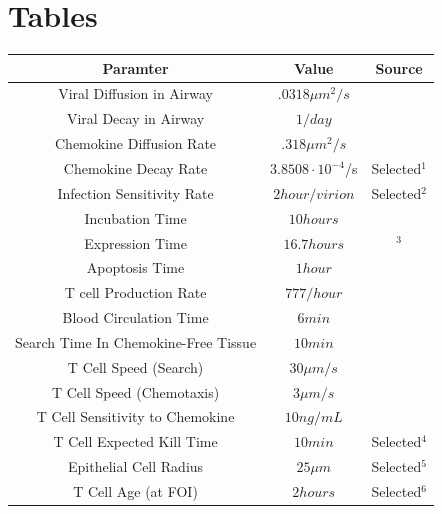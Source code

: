 \documentclass[10pt]{article}
\begin{document}
\section*{Tables}


\begin{table}
\begin{center}
\begin{tabular}{ | c | c | c | }
  \hline                        
  Paramter & Value & Source \\
  \hline
  Viral Diffusion in Airway & $.0318 \mu m^2/s$ & \cite{Beauchemin2006} \\
  Viral Decay in Airway &  $1/day$ & \cite{Lee2009} \\
  Chemokine Diffusion Rate & $.318 \mu m^2/s$ & \cite{Beauchemin2006} \\
  Chemokine Decay Rate &  $3.8508\cdot10^{-4}$/s & Selected$^1$\\
  Infection Sensitivity Rate &  $2 hour/virion$ &  Selected$^2$ \\
  Incubation Time &  $10 hours$ & \cite{Mitchell2011} \\
  Expression Time &  $16.7 hours$ & \cite{Mitchell2011}$^3$ \\
  Apoptosis Time & $1 hour$ & \cite{Ganusov2008} \\
  T cell Production Rate & $777/hour$ & \cite{Miao2010} \\ 
  Blood Circulation Time & $6 min$ & \cite{Banerjee2010b} \\
  Search Time In Chemokine-Free Tissue & $10 min$ & \cite{Banerjee2010b} \\
  T Cell Speed (Search) & $30 \mu m/s$ & \cite{Miller2003} \\
  T Cell Speed (Chemotaxis) & $3 \mu m/s$ & \cite{Miller2003} \\
  T Cell Sensitivity to Chemokine & $10 ng/mL$ & \cite{Gao2003} \\
  T Cell Expected Kill Time & $10 min$ & Selected$^4$ \\
  Epithelial Cell Radius & $25 \mu m$ & Selected$^5$ \\
  T Cell Age (at FOI) & $2 hours$ & Selected$^6$ \\

\end{tabular}
\end{center}
\end{table}
\end{document}
